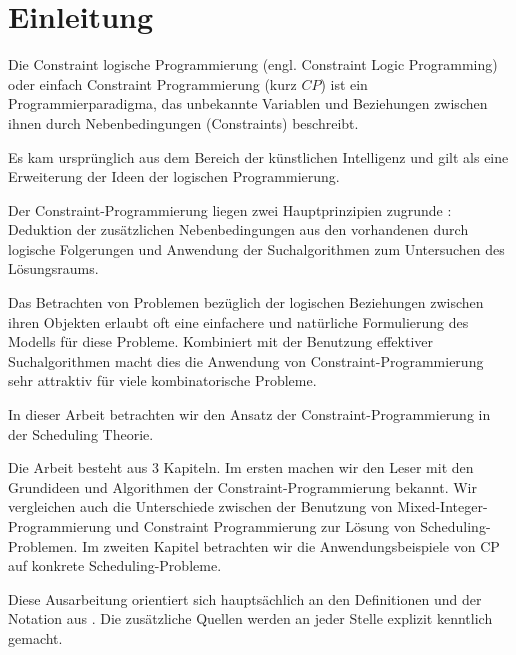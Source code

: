 \chapter*{ Einleitung}
\label{sec:Einletung}

\FloatBarrier 
Die Constraint logische Programmierung (engl. Constraint Logic Programming) oder einfach Constraint Programmierung (kurz $CP$) ist ein Programmierparadigma, das unbekannte Variablen und Beziehungen zwischen ihnen durch Nebenbedingungen (Constraints) beschreibt. 

Es kam ursprünglich aus dem Bereich der künstlichen Intelligenz und gilt als eine Erweiterung der Ideen der logischen Programmierung.

Der Constraint-Programmierung liegen zwei Hauptprinzipien zugrunde \citep[vgl][]{CBScheduling} : Deduktion der zusätzlichen Nebenbedingungen aus den vorhandenen durch logische Folgerungen und Anwendung der Suchalgorithmen zum Untersuchen des Lösungsraums. 

Das Betrachten von Problemen bezüglich der logischen Beziehungen zwischen ihren Objekten erlaubt oft eine einfachere und natürliche Formulierung des Modells für diese Probleme. Kombiniert mit der Benutzung effektiver Suchalgorithmen macht dies die Anwendung von Constraint-Programmierung sehr attraktiv für viele kombinatorische Probleme.

In dieser Arbeit betrachten wir den Ansatz der Constraint-Programmierung in der Scheduling Theorie.

Die Arbeit besteht aus $3$ Kapiteln. Im ersten machen wir den Leser mit den Grundideen und Algorithmen der Constraint-Programmierung bekannt. Wir vergleichen auch die Unterschiede zwischen der Benutzung von Mixed-Integer-Programmierung und Constraint Programmierung zur Lösung von Scheduling-Problemen. Im zweiten Kapitel betrachten wir die Anwendungsbeispiele von CP auf konkrete Scheduling-Probleme.

Diese Ausarbeitung orientiert sich hauptsächlich an den Definitionen und der
Notation aus \cite{CPforScheduling}. Die zusätzliche Quellen werden an jeder Stelle explizit kenntlich gemacht.

